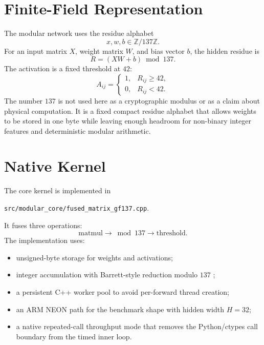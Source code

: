 \documentclass[11pt]{article}
\begin{document}
\section{Finite-Field Representation}

The modular network uses the residue alphabet
\begin{equation}
    x,w,b \in \mathbb{Z}/137\mathbb{Z}.
\end{equation}
For an input matrix $X$, weight matrix $W$, and bias vector $b$, the hidden
residue is
\begin{equation}
    R = (XW+b)\bmod 137.
\end{equation}
The activation is a fixed threshold at $42$:
\begin{equation}
    A_{ij} =
    \begin{cases}
        1, & R_{ij}\ge 42,\\
        0, & R_{ij}<42.
    \end{cases}
\end{equation}
The number $137$ is not used here as a cryptographic modulus or as a claim
about physical computation.  It is a fixed compact residue alphabet that allows
weights to be stored in one byte while leaving enough headroom for non-binary
integer features and deterministic modular arithmetic.

\section{Native Kernel}

The core kernel is implemented in
\begin{center}
\texttt{src/modular\_core/fused\_matrix\_gf137.cpp}.
\end{center}
It fuses three operations:
\begin{equation}
    \mathrm{matmul}
    \rightarrow
    \bmod 137
    \rightarrow
    \mathrm{threshold}.
\end{equation}
The implementation uses:
\begin{itemize}
    \item unsigned-byte storage for weights and activations;
    \item integer accumulation with Barrett-style reduction modulo $137$
    \cite{barrett1986};
    \item a persistent C++ worker pool to avoid per-forward thread creation;
    \item an ARM NEON path \cite{armneon} for the benchmark shape with hidden
    width $H=32$;
    \item a native repeated-call throughput mode that removes the Python/ctypes
    call boundary from the timed inner loop.
\end{itemize}
\end{document}
